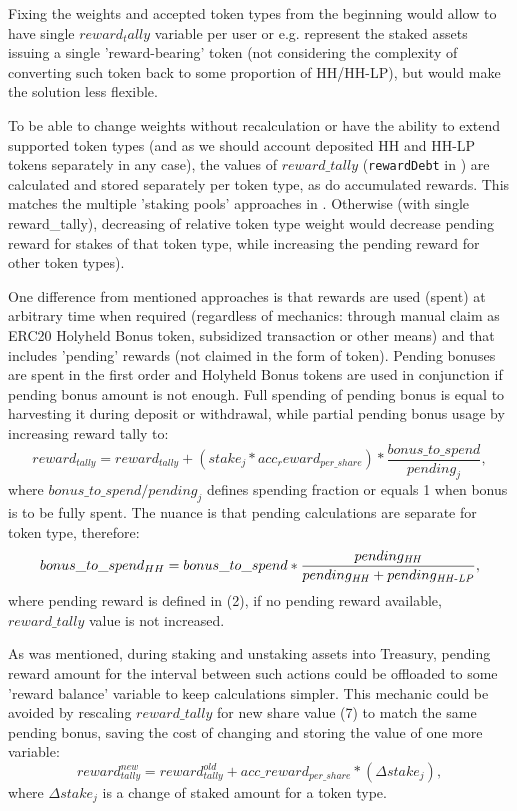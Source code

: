 \documentclass[12pt]{article}
\begin{document}
Fixing the weights and accepted token types from the beginning would allow to have single $\mathit{reward_tally}$ variable per user or e.g. represent the staked assets issuing a single 'reward-bearing' token (not considering the complexity of converting such token back to some proportion of HH/HH-LP), but would make the solution less flexible.

To be able to change weights without recalculation or have the ability to extend supported token types (and as we should account deposited HH and HH-LP tokens separately in any case), the values of $\mathit{reward\_tally}$ (\texttt{rewardDebt} in \cite{sushichef}) are calculated and stored separately per token type, as do accumulated rewards. This matches the multiple 'staking pools' approaches in \cite{sushichef}. Otherwise (with single reward\_tally), decreasing of relative token type weight would decrease pending reward for stakes of that token type, while increasing the pending reward for other token types).

\bigskip

One difference from mentioned approaches is that rewards are used (spent) at arbitrary time when required (regardless of mechanics: through manual claim as ERC20 Holyheld Bonus token, subsidized transaction or other means) and that includes 'pending' rewards (not claimed in the form of token). Pending bonuses are spent in the first order and Holyheld Bonus tokens are used in conjunction if pending bonus amount is not enough. Full spending of pending bonus is equal to harvesting it during deposit or withdrawal, while partial pending bonus usage by increasing reward tally to:
\begin{equation}
	reward_{\mathit{tally}} = reward_{\mathit{tally}} + (stake_{j} * acc_reward_{\mathit{per\_share}}) * \frac{bonus\_to\_spend}{pending_{j}},
\end{equation}
where $bonus\_to\_spend/pending_{j}$ defines spending fraction or equals 1 when bonus is to be fully spent. The nuance is that pending calculations are separate for token type, therefore:
\begin{equation}
	bonus\_to\_spend_{HH} = bonus\_to\_spend * \frac{pending_{\mathit{HH}}}{pending_{\mathit{HH}} + pending_{\mathit{HH{\text -}LP}}},
\end{equation}
where pending reward is defined in (2), if no pending reward available, $reward\_tally$ value is not increased.

As was mentioned, during staking and unstaking assets into Treasury, pending reward amount for the interval between such actions could be offloaded to some 'reward balance' variable to keep calculations simpler.  This mechanic could be avoided by rescaling $reward\_tally$ for new share value (7) to match the same pending bonus, saving the cost of changing and storing the value of one more variable:
\begin{equation}
	reward_{\mathit{tally}}^{new} = reward_{\mathit{tally}}^{old} + acc\_reward_{\mathit{per\_share}} * (\Delta stake_{j}),
\end{equation}
where $\Delta stake_{j}$ is a change of staked amount for a token type.
\end{document}
